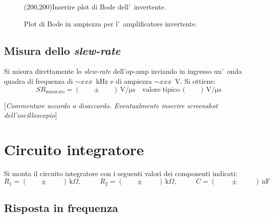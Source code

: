\documentclass[10pt,a4paper]{article}
\newcommand{\rem}[1]{[\emph{#1}]}
\newcommand{\exn}{\phantom{xxx}}
\begin{document}
	
	
	\begin{figure}[h]
		\begin{center}
			\framebox(200,200){Inserire plot di Bode dell'~invertente.}
			\caption{\small Plot di Bode in ampiezza per l'~amplificatore invertente.}
			\label{fig:bodeinv}
		\end{center}
	\end{figure}
	\subsection{Misura dello \emph{slew-rate}}
	Si misura direttamente lo \emph{slew-rate} dell'op-amp inviando in ingresso un'~onda quadra 
	di frequenza di $\sim xxx$~kHz e di ampiezza $\sim xxx$~V. Si ottiene:
	\[
	SR_\mathrm{misurato} = (\exn \pm \exn )\,\mathrm{V/\mu s} \quad \mathrm{valore \; tipico}\, (\exn )\,\mathrm{V/\mu s}\
	\]
	
	\rem{Commentare accordo o disaccordo. Eventualmente inserire screenshot dell'oscilloscopio}
	\section{Circuito integratore}
	Si monta il circuito integratore con i seguenti valori  dei componenti indicati: 
	\[
	R_1 = (\exn \pm \exn \;) \,\mathrm{k}\Omega, \:\:\;\:\exn 
	R_2 = (\exn \pm \exn \;) \,\mathrm{k}\Omega, \:\:\;\:\exn 
	C = (\;\exn \pm \exn \;\;)\,\mathrm{nF}
	\]
	
	\subsection{Risposta in frequenza}
	
\end{document}
